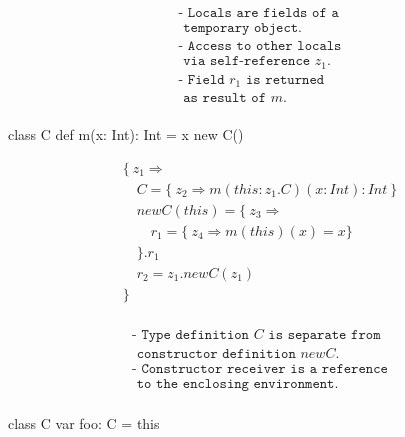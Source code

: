 \begin{equation*}
\begin{array}{l}
\texttt{- Locals are fields of a} \\
\texttt{ \ temporary object.} \\

\texttt{- Access to other locals} \\
\texttt{ \ via self-reference $z_1$.} \\

\texttt{- Field $r_1$ is returned} \\
\texttt{ \ as result of $m$.} \\
\end{array}
\end{equation*}


class C {
  def m(x: Int): Int = x
}
new C()

\begin{equation*}
\begin{array}{l}
\{\ z_1 \Rightarrow \\
\quad C = \{\ z_2 \Rightarrow m(this: z_1.C)(x: Int): Int\ \} \\
\quad newC(this) = \{\ z_3 \Rightarrow \\
\quad \quad r_1 = \{\ z_4 \Rightarrow m(this)(x) = x \} \\
\quad \}.r_1 \\
\quad r_2 = z_1.newC(z_1) \\
\} \\
\end{array}
\end{equation*}

\begin{equation*}
\begin{array}{l}
\texttt{- Type definition $C$ is separate from} \\
\texttt{ \ constructor definition $newC$.} \\

\texttt{- Constructor receiver is a reference} \\
\texttt{ \ to the enclosing environment.} \\
\end{array}
\end{equation*}





class C {
  var foo: C = this
}


